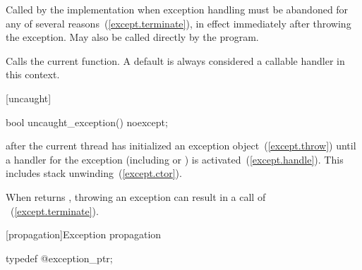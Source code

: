 \begin{itemdescr}
\pnum
\remarks
Called by the implementation when exception
handling must be abandoned for any of several reasons~(\ref{except.terminate}),
in effect immediately after throwing the exception.
May also be called directly by the program.

\pnum
\effects
Calls the current  function. \enternote A
default  is always considered a callable handler in
this context. \exitnote
\end{itemdescr}

[uncaught]{}

%
\begin{itemdecl}
bool uncaught_exception() noexcept;
\end{itemdecl}

\begin{itemdescr}
\pnum
\returns
{}
after
the current thread has initialized
an exception object~(\ref{except.throw})
until a handler for the exception (including 
or ) is activated~(\ref{except.handle}).
\enternote
This includes stack unwinding~(\ref{except.ctor}).
\exitnote

\pnum
\notes
When
returns
,
throwing an exception can result in a call of
~(\ref{except.terminate}).
\end{itemdescr}

[propagation]{Exception propagation}

\begin{itemdecl}
typedef @\unspec@ exception_ptr;
\end{itemdecl}

